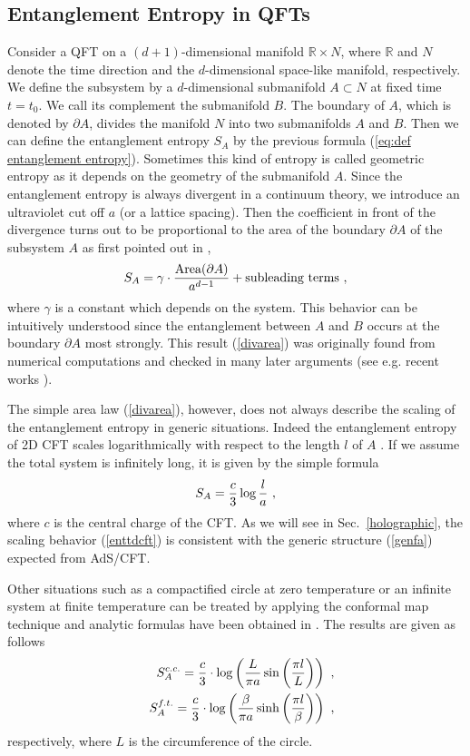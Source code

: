 \documentclass[12pt]{article}
\def\frac#1#2{{#1\over #2}}
\def\de{\partial}
\def\f {\frac}
\def\frac#1#2{{#1\over #2}}
\def\be{\begin{equation}}
\def\ee{\end{equation}}
\def\ba{\begin{eqnarray}}
\def\ea{\end{eqnarray}}
\begin{document}
\subsection{Entanglement Entropy in QFTs}
\label{EE in QFT, Area}
\hspace{5mm}  Consider a QFT on a $(d+1)$-dimensional manifold
$\mathbb{R}\times N$, where $\mathbb{R}$ and $N$
 denote the time direction and the $d$-dimensional
 space-like manifold, respectively.
We define the subsystem by a $d$-dimensional submanifold $A\subset
N$ at fixed time $t=t_0$. We call its complement the submanifold
$B$. The boundary of $A$, which is denoted by $\de A$, divides the
manifold $N$ into two submanifolds $A$ and $B$. Then we can define
the entanglement entropy $S_A$ by the previous formula (\ref{eq:def
entanglement entropy}). Sometimes this kind of entropy is called
geometric entropy as it depends on the geometry of the submanifold
$A$. Since the entanglement entropy is always divergent in a
continuum theory,
we introduce an
ultraviolet cut off $a$ (or a lattice spacing).
 Then the coefficient in
front of the divergence turns out to be proportional to the area of
the boundary $\de A$ of the subsystem $A$ as first pointed out in
\cite{Bombelli,Srednicki}, \be S_A=\gamma\cdot \f{\mbox{Area}(\de
A)}{a^{d-1}}+\mbox{subleading terms} \ ,
 \label{divarea}\ee
where $\gamma$ is a constant which depends on the system. This
behavior can be intuitively understood since the entanglement
between $A$ and $B$ occurs at the boundary $\de A$ most strongly.
This result (\ref{divarea}) was originally found from numerical
computations \cite{Srednicki,Bombelli} and checked in many later
arguments (see e.g. recent works \cite{Eisert, Das, Casiniarea} ).



The simple area law (\ref{divarea}), however, does not always
describe the scaling of the entanglement entropy in generic
situations. Indeed the
entanglement entropy of 2D CFT scales
logarithmically with respect to the length $l$ of $A$ \cite{HLW,Cardy}.
If we assume the total system is infinitely long,
it is given by the simple formula \cite{HLW,Cardy}
\be
S_A=\frac{c}{3}\log \f{l}{a} \ , \label{enttdcft}
\ee
where $c$ is the central charge of the CFT.
As we will see in Sec.\ \ref{holographic},
the scaling behavior (\ref{enttdcft})
is
consistent with the generic structure (\ref{genfa})
expected from AdS/CFT.

Other situations
such as a compactified circle at zero
temperature or an infinite system at finite temperature can be
treated by applying the
conformal map technique and analytic formulas have been
obtained in \cite{Cardy}.
The results are given as follows
\ba
&& S^{c.c.}_A = \f{c}{3}\cdot\log\left(\f{L}{\pi a}\sin\left(\f{\pi
l}{L}\right)\right) \ , \label{entropyone} \\
&& S^{f.t.}_A=\f{c}{3}\cdot\log\left(\f{\beta}{\pi
a}\sinh\left(\f{\pi l}{\beta}\right)\right) \ ,
\label{entropytemp}
\ea
respectively, where $L$ is the circumference of the circle.
\end{document}
